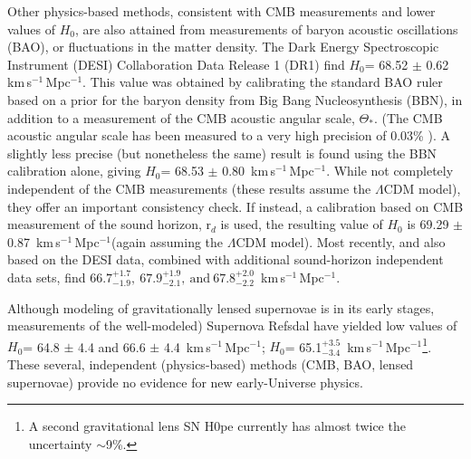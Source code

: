 \documentclass[12pt,modern]{aastex631}
\newcommand{\ho}{$H_{0}$\xspace}
\newcommand{\hounits}{\,km\,s$^{-1}$\,Mpc$^{-1}$\xspace}
\begin{document}
Other physics-based methods, consistent with CMB measurements and lower values of \ho, are also attained from measurements of baryon acoustic oscillations (BAO), or fluctuations in the matter density.  The Dark Energy Spectroscopic Instrument (DESI) Collaboration Data Release 1 (DR1) \citep{DESI_2024} find \ho = 68.52 $\pm$ 0.62 \hounits. This value was obtained by calibrating the standard BAO ruler based on a prior for the baryon density from Big Bang Nucleosynthesis (BBN), in addition to a  measurement of the CMB acoustic angular scale, $\Theta_*$. (The CMB acoustic angular scale has been measured to a very high precision of 0.03\% \citep{planck_2018}). A slightly less precise (but nonetheless the same) result is found using the BBN calibration alone, giving \ho = 68.53 $\pm$ 0.80 \hounits.  While not completely independent of the CMB measurements (these results assume the $\Lambda$CDM model), they offer an important consistency check. If instead, a calibration based on CMB measurement of the sound horizon, r$_d$ is used, the resulting value of \ho is 69.29 $\pm$ 0.87 \hounits (again assuming the $\Lambda$CDM model). Most recently, and also based on the DESI data, combined with additional sound-horizon independent data sets,  \citet{zaborowski_2024} find $66.7^{+1.7}_{-1.9}, \ 67.9^{+1.9}_{-2.1}, \ \text{and} \ 67.8^{+2.0}_{-2.2}$ \hounits. 

Although modeling of gravitationally lensed supernovae is in its early stages,  measurements of the  well-modeled) Supernova Refsdal have yielded low values of \ho = 64.8 $\pm$ 4.4 and 66.6 $\pm$ 4.4 \hounits \citep{kelly_2023}; \ho = 65.1$_{-3.4}^{+3.5}$ \hounits \citep{grillo_2024}\footnote{A second gravitational lens SN H0pe \citep{pascale_2025} currently has almost twice the uncertainty  $\sim$9\%.}. These several, independent (physics-based) methods (CMB, BAO, lensed supernovae) provide no evidence for new early-Universe physics.
\end{document}
